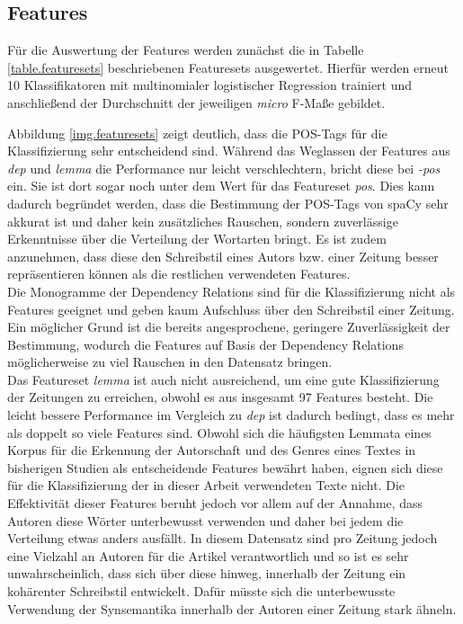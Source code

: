 

\subsection{Features}\label{features_analyzed}
Für die Auswertung der Features werden zunächst die in Tabelle \ref{table.featuresets} beschriebenen Featuresets ausgewertet. Hierfür werden erneut 10 Klassifikatoren mit multinomialer logistischer Regression trainiert und anschließend der Durchschnitt der jeweiligen \textit{micro} F-Maße gebildet.


Abbildung \ref{img.featuresets} zeigt deutlich, dass die POS-Tags für die Klassifizierung sehr entscheidend sind. Während das Weglassen der Features aus \textit{dep} und \textit{lemma} die Performance nur leicht verschlechtern, bricht diese bei \textit{-pos} ein. Sie ist dort sogar noch unter dem Wert für das Featureset \textit{pos}. Dies kann dadurch begründet werden, dass die Bestimmung der POS-Tags von spaCy sehr akkurat ist und daher kein zusätzliches Rauschen, sondern zuverlässige Erkenntnisse über die Verteilung der Wortarten bringt. Es ist zudem anzunehmen, dass diese den Schreibstil eines Autors bzw. einer Zeitung besser repräsentieren können als die restlichen verwendeten Features.\\
Die Monogramme der Dependency Relations sind für die Klassifizierung nicht als Features geeignet und geben kaum Aufschluss über den Schreibstil einer Zeitung. Ein möglicher Grund ist die bereits angesprochene, geringere Zuverlässigkeit der Bestimmung, wodurch die Features auf Basis der Dependency Relations möglicherweise zu viel Rauschen in den Datensatz bringen.\\
Das Featureset \textit{lemma} ist auch nicht ausreichend, um eine gute Klassifizierung der Zeitungen zu erreichen, obwohl es aus insgesamt 97 Features besteht. Die leicht bessere Performance im Vergleich zu \textit{dep} ist dadurch bedingt, dass es mehr als doppelt so viele Features sind. Obwohl sich die häufigsten Lemmata eines Korpus für die Erkennung der Autorschaft und des Genres eines Textes in bisherigen Studien als entscheidende Features bewährt haben, eignen sich diese für die Klassifizierung der in dieser Arbeit verwendeten Texte nicht. Die Effektivität dieser Features beruht jedoch vor allem auf der Annahme, dass Autoren diese Wörter unterbewusst verwenden und daher bei jedem die Verteilung etwas anders ausfällt. In diesem Datensatz sind pro Zeitung jedoch eine Vielzahl an Autoren für die Artikel verantwortlich und so ist es sehr unwahrscheinlich, dass sich über diese hinweg, innerhalb der Zeitung ein kohärenter Schreibstil entwickelt. Dafür müsste sich die unterbewusste Verwendung der Synsemantika innerhalb der Autoren einer Zeitung stark ähneln.

